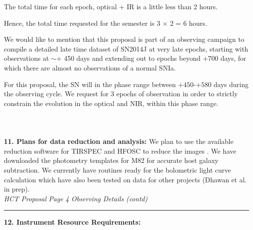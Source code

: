 \documentclass[11pt]{article}
\begin{document}
The total time for each epoch, optical + IR is  a little less than 2 hours.

 Hence, the total time requested for the semester is 3 $\times$ 2 = 6 hours. 


We would like to mention that this proposal is part of an observing campaign to compile a detailed late time dataset of SN2014J at very late epochs, starting with observations at $\sim +$ 450 days and extending out to epochs beyond $+$700 days, for which there are almost no observations of a normal SNIa. 

For this proposal, the SN will  in the phase range between $+450$-$+580$ days during the observing cycle.  We request for 3 epochs of observation in order to strictly constrain the evolution in the optical and NIR, within this phase range. 
\\
\\
\\
\\
{\bf 11. Plans for data reduction and analysis: }
We plan to use the available reduction software for TIRSPEC and HFOSC to reduce the images .
We have downloaded the photometry templates %
 for M82 for accurate host galaxy subtraction. 
We currently have routines ready for the bolometric light curve calculation which have also been tested on data for other projects (Dhawan et al. in prep). 
 \\


{\it HCT Proposal}\hskip 5cm {\it Page 4} \hfill {\it Observing Details (contd)}\\[1mm]
\hrule
{\bf 12. Instrument Resource Requirements:}\\[1mm]
\end{document}
